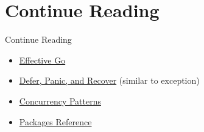 \documentclass[xetex,mathserif,serif,12pt]{beamer}
\begin{document}
\section{Continue Reading}

\begin{frame}{Continue Reading}
  \begin{itemize}
  \item \href{http://golang.org/doc/effective_go.html}{Effective Go}
  \item \href{http://golang.org/doc/articles/defer_panic_recover.html}{Defer,
      Panic, and Recover} (similar to exception)
  \item
    \href{http://golang.org/doc/articles/concurrency_patterns.html}{Concurrency
      Patterns}
  \item \href{http://golang.org/pkg/}{Packages Reference}
\end{itemize}
\end{frame}
\end{document}
